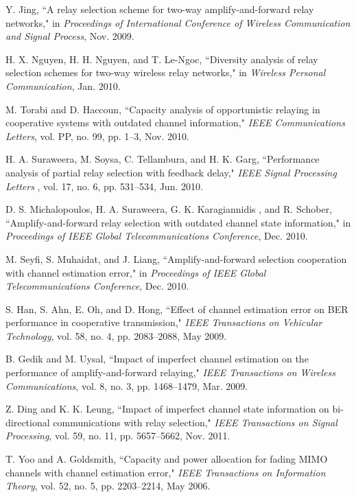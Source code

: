 \documentclass[onecolumn,letterpaper,11pt,draftclsnofoot]{IEEEtran}
\begin{document}
\begin{thebibliography}{1}
 Y. Jing, ``A relay selection scheme for two-way amplify-and-forward relay
networks," in \emph{Proceedings of International Conference of
Wireless Communication and Signal Process}, Nov. 2009.

H. X. Nguyen, H. H. Nguyen, and T. Le-Ngoc, ``Diversity analysis of
relay selection schemes for two-way wireless relay networks," in
\emph{Wireless  Personal Communication}, Jan.  2010.

M. Torabi and D. Haccoun, ``Capacity analysis of opportunistic
relaying in cooperative systems with outdated channel information,"
\emph{IEEE Communications Letters}, vol. PP, no. 99, pp. 1--3, Nov.
2010.

H. A. Suraweera, M. Soysa, C. Tellambura, and H. K. Garg, ``Performance analysis of partial relay selection with feedback delay,"
\emph{IEEE Signal Processing Letters }, vol. 17, no. 6, pp.
531--534, Jun. 2010.

D. S. Michalopoulos, H. A. Suraweera, G. K. Karagiannidis , and R. Schober, ``Amplify-and-forward relay selection with outdated
channel state information," in \emph{Proceedings of IEEE Global
Telecommunications Conference}, Dec. 2010.

M. Seyfi, S. Muhaidat, and J. Liang, ``Amplify-and-forward
selection cooperation with channel estimation error," in
\emph{Proceedings of IEEE Global Telecommunications Conference},
Dec. 2010.

S. Han, S. Ahn, E. Oh, and D. Hong, ``Effect
of channel estimation error on BER performance in cooperative
transmission," \emph{IEEE Transactions on Vehicular Technology},
vol. 58, no. 4, pp. 2083--2088, May 2009.

B. Gedik and M. Uysal, ``Impact of imperfect channel estimation
on the performance of amplify-and-forward relaying," \emph{IEEE
Transactions on Wireless Communications}, vol. 8, no. 3, pp.
1468--1479, Mar. 2009.

Z. Ding and K. K. Leung, ``Impact of imperfect channel state
information on bi-directional communications with relay selection,"
\emph{IEEE Transactions on Signal Processing}, vol. 59, no. 11, pp.
5657--5662, Nov. 2011.

T. Yoo and A. Goldsmith, ``Capacity and power allocation for
fading MIMO channels with channel estimation error," \emph{IEEE
Transactions on Information Theory}, vol. 52, no. 5, pp. 2203--2214,
May 2006.


\end{thebibliography}
\end{document}
